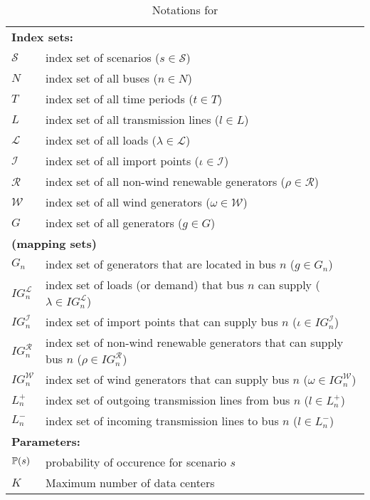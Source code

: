 \begin{table}[H]
	\centering
	\caption{Notations for \sdcp}
	\label{sdcp:notation}
	\resizebox{\textwidth}{!}
	{
		\begin{tabular}{ll}
			\toprule
			\multicolumn{2}{l}{\textbf{Index sets:}} \\
			$\mathcal{S}$ & index set of scenarios ($s\in\mathcal{S}$) 		\\ 		
			$N$ & index set of all buses ($n\in N$)\\
			$T$ & index set of all time periods ($t\in T$)\\
			$L$ & index set of all transmission lines ($l\in L$) \\
			$\mathcal{L}$ & index set of all loads ($\lambda \in \mathcal{L}$)\\
			$\mathcal{I}$ & index set of all import points ($\iota\in \mathcal{I}$)\\
			$\mathcal{R}$ & index set of all non-wind renewable generators ($\rho\in \mathcal{R}$)\\
			$\mathcal{W}$ & index set of all wind generators ($\omega\in \mathcal{W}$)\\
			$G$ & index set of all generators ($g\in G$)\\
			\multicolumn{2}{l}{\textbf{(mapping sets)}} \\
			$G_n$ & index set of generators that are located in bus $n$ ($g\in G_n$)\\
			$IG_n^\mathcal{L}$ & index set of loads (or demand) that bus $n$ can supply ($\lambda\in IG_n^\mathcal{L}$)\\
			$IG_n^\mathcal{I}$ & index set of import points that can supply bus $n$ ($\iota\in IG_n^\mathcal{I}$) \\
			$IG_n^\mathcal{R}$ & index set of non-wind renewable generators that can supply bus $n$ ($\rho\in IG_n^\mathcal{R}$) \\
			$IG_n^\mathcal{W}$ & index set of wind generators that can supply bus $n$ ($\omega\in IG_n^\mathcal{W}$)\\
			$L_n^{+}$ & index set of outgoing transmission lines from bus $n$ ($l\in L_n^+$)\\
			$L_n^{-}$ & index set of incoming transmission lines to bus $n$ ($l\in L_n^-$)\\ \midrule
			\multicolumn{2}{l}{\textbf{Parameters:}} \\
			$\operatorname*{\mathbb{P}}(s)$	&probability of occurence for scenario $s$\\
			$K$	& Maximum number of data centers \\

\end{tabular}}
\end{table}
